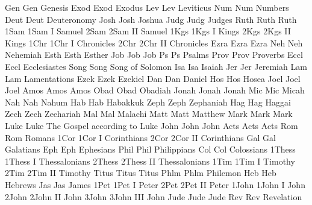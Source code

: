 
\BookTitle Gen    Gen          {Genesis}
\BookTitle Exod   Exod         {Exodus}
\BookTitle Lev    Lev          {Leviticus}
\BookTitle Num    Num          {Numbers}
\BookTitle Deut   Deut         {Deuteronomy}
\BookTitle Josh   Josh         {Joshua}
\BookTitle Judg   Judg         {Judges}
\BookTitle Ruth   Ruth         {Ruth}
\BookTitle 1Sam   1Sam         {I Samuel}
\BookTitle 2Sam   2Sam         {II Samuel}
\BookTitle 1Kgs   1Kgs         {I Kings}
\BookTitle 2Kgs   2Kgs         {II Kings}
\BookTitle 1Chr   1Chr         {I Chronicles}
\BookTitle 2Chr   2Chr         {II Chronicles}
\BookTitle Ezra   Ezra         {Ezra}
\BookTitle Neh    Neh          {Nehemiah}
\BookTitle Esth   Esth         {Esther}
\BookTitle Job    Job          {Job}
\BookTitle Ps     Ps           {Psalms}
\BookTitle Prov   Prov         {Proverbs}
\BookTitle Eccl   Eccl         {Ecclesiastes}
\BookTitle Song   Song         {Song of Solomon}
\BookTitle Isa    Isa          {Isaiah}
\BookTitle Jer    Jer          {Jeremiah}
\BookTitle Lam    Lam          {Lamentations}
\BookTitle Ezek   Ezek         {Ezekiel}
\BookTitle Dan    Dan          {Daniel}
\BookTitle Hos    Hos          {Hosea}
\BookTitle Joel   Joel         {Joel}
\BookTitle Amos   Amos         {Amos}
\BookTitle Obad   Obad         {Obadiah}
\BookTitle Jonah  Jonah        {Jonah}
\BookTitle Mic    Mic          {Micah}
\BookTitle Nah    Nah          {Nahum}
\BookTitle Hab    Hab          {Habakkuk}
\BookTitle Zeph   Zeph         {Zephaniah}
\BookTitle Hag    Hag          {Haggai}
\BookTitle Zech   Zech         {Zechariah}
\BookTitle Mal    Mal          {Malachi}
\BookTitle Matt   Matt         {Matthew}
\BookTitle Mark   Mark         {Mark}
\BookTitle Luke   Luke         {The Gospel according to Luke}
\BookTitle John   John         {John}
\BookTitle Acts   Acts         {Acts}
\BookTitle Rom    Rom          {Romans}
\BookTitle 1Cor   1Cor         {I Corinthians}
\BookTitle 2Cor   2Cor         {II Corinthians}
\BookTitle Gal    Gal          {Galatians}
\BookTitle Eph    Eph          {Ephesians}
\BookTitle Phil   Phil         {Philippians}
\BookTitle Col    Col          {Colossians}
\BookTitle 1Thess 1Thess       {I Thessalonians}
\BookTitle 2Thess 2Thess       {II Thessalonians}
\BookTitle 1Tim   1Tim         {I Timothy}
\BookTitle 2Tim   2Tim         {II Timothy}
\BookTitle Titus  Titus        {Titus}
\BookTitle Phlm   Phlm         {Philemon}
\BookTitle Heb    Heb          {Hebrews}
\BookTitle Jas    Jas          {James}
\BookTitle 1Pet   1Pet         {I Peter}
\BookTitle 2Pet   2Pet         {II Peter}
\BookTitle 1John  1John        {I John}
\BookTitle 2John  2John        {II John}
\BookTitle 3John  3John        {III John}
\BookTitle Jude   Jude         {Jude}
\BookTitle Rev    Rev          {Revelation}
\def\nochapbooks{Obad Phlm 2John 3John Jude}
\endinput
